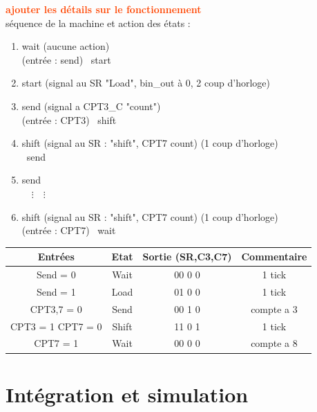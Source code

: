 \documentclass[a4paper]{article} %
\newcommand{\red}[1]{\textbf{\textcolor{OrangeRed}{#1}}}
\begin{document}
\begin{tcolorbox}[colframe=Monokaimagenta,colback=white, breakable, enhanced]
\red{ajouter les détails sur le fonctionnement}\\
séquence de la machine et action des états :
\begin{enumerate}
	\item wait (aucune action)\\
	(entrée : send) \textrightarrow\ start
	\item start (signal au SR "Load", bin\_out à 0, 2 coup d'horloge)
	\item send (signal a CPT3\_C "count")\\
	(entrée : CPT3) \textrightarrow\ shift
	\item shift (signal au SR : "shift", CPT7 count) (1 coup d'horloge)\\
	\textrightarrow\ send
	\item send \\
	$ \quad \vdots \quad \vdots$
	\item shift (signal au SR : "shift", CPT7 count) (1 coup d'horloge)\\
	(entrée : CPT7) \textrightarrow\ wait
\end{enumerate}
\begin{tabular}{|c c c c|}
\hline
Entrées & Etat & Sortie  (SR,C3,C7) & Commentaire\\
\hline
Send = 0 & Wait & 00 0 0 & 1 tick\\
Send = 1 & Load & 01 0 0 & 1 tick\\
CPT3,7 = 0 & Send & 00 1 0 & compte a 3\\
CPT3 = 1 CPT7 = 0& Shift & 11 0 1 & 1 tick\\
CPT7 = 1 & Wait & 00 0 0 & compte a 8\\
\hline
\end{tabular}

\end{tcolorbox}
\section {Intégration et simulation}
\end{document}
